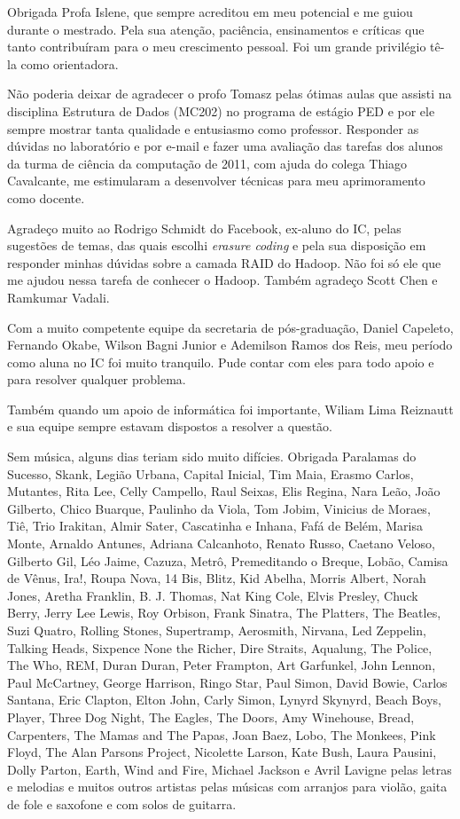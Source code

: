 Obrigada Profa Islene, que sempre acreditou em meu potencial e me guiou durante o mestrado. Pela sua atenção, paciência, ensinamentos e críticas que tanto contribuíram para o meu crescimento pessoal. Foi um grande privilégio tê-la como orientadora.

Não poderia deixar de agradecer o profo Tomasz pelas ótimas aulas que assisti na disciplina Estrutura de Dados (MC202) no programa de estágio PED e por ele sempre mostrar tanta qualidade e entusiasmo como professor. Responder as dúvidas no laboratório e por e-mail e fazer uma avaliação das tarefas dos alunos da turma de ciência da computação de 2011, com ajuda do colega Thiago Cavalcante, me estimularam a desenvolver técnicas para meu aprimoramento como docente.

Agradeço muito ao Rodrigo Schmidt do Facebook, ex-aluno do IC, pelas sugestões de temas, das quais escolhi \emph{erasure coding} e pela sua disposição em responder minhas dúvidas sobre a camada RAID do Hadoop. Não foi só ele que me ajudou nessa tarefa de conhecer o Hadoop. Também agradeço Scott Chen e Ramkumar Vadali.

Com a muito competente equipe da secretaria de pós-graduação, Daniel Capeleto, Fernando Okabe, Wilson Bagni Junior e Ademilson Ramos dos Reis, meu período como aluna no IC foi muito tranquilo. Pude contar com eles para todo apoio e para resolver qualquer problema.

Também quando um apoio de informática foi importante, Wiliam Lima Reiznautt e sua equipe sempre estavam dispostos a resolver a questão.

Sem música, alguns dias teriam sido muito difícies. Obrigada Paralamas do Sucesso, Skank, Legião Urbana, Capital Inicial, Tim Maia, Erasmo Carlos, Mutantes, Rita Lee, Celly Campello, Raul Seixas, Elis Regina, Nara Leão, João Gilberto, Chico Buarque, Paulinho da Viola, Tom Jobim, Vinicius de Moraes, Tiê, Trio Irakitan, Almir Sater, Cascatinha e Inhana, Fafá de Belém, Marisa Monte, Arnaldo Antunes,  Adriana Calcanhoto, Renato Russo, Caetano Veloso, Gilberto Gil, Léo Jaime, Cazuza, Metrô, Premeditando o Breque, Lobão, Camisa de Vênus, Ira!, Roupa Nova, 14 Bis, Blitz, Kid Abelha, Morris Albert, Norah Jones, Aretha Franklin, B. J. Thomas, Nat King Cole, Elvis Presley, Chuck Berry, Jerry Lee Lewis, Roy Orbison, Frank Sinatra, The Platters, The Beatles, Suzi Quatro, Rolling Stones, Supertramp, Aerosmith, Nirvana, Led Zeppelin, Talking Heads, Sixpence None the Richer, Dire Straits, Aqualung, The Police, The Who, REM, Duran Duran, Peter Frampton, Art Garfunkel, John Lennon, Paul McCartney, George Harrison, Ringo Star, Paul Simon, David Bowie, Carlos Santana, Eric Clapton, Elton John, Carly Simon, Lynyrd Skynyrd, Beach Boys, Player, Three Dog Night, The Eagles, The Doors, Amy Winehouse, Bread, Carpenters, The Mamas and The Papas, Joan Baez, Lobo, The Monkees, Pink Floyd, The Alan Parsons Project, Nicolette Larson, Kate Bush, Laura Pausini, Dolly Parton, Earth, Wind and Fire, Michael Jackson e Avril Lavigne pelas letras e melodias e muitos outros artistas pelas músicas com arranjos para violão, gaita de fole e saxofone e com solos de guitarra.

